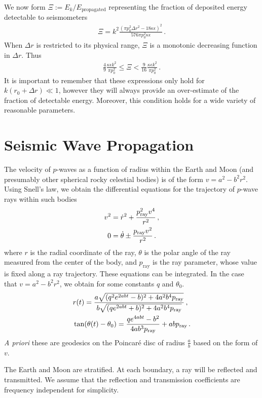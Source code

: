 \documentclass[prd,reprint,10pt,tightenlines]{revtex4-1}
\newcommand*\te[1]{\text{#1}}
\newcommand*\p[1]{\left(#1\right)}
\newcommand*\f[2]{\frac{#1}{#2}}
\begin{document}
We now form $\Xi:=E_k/E_\te{propagated}$ representing the fraction of deposited energy detectable to seismometers
\begin{align}
\Xi = k^2\f{\p{\pi p_0^2\Delta r^2-18\kappa \epsilon}^2}{576 \pi p_0^2 \kappa \epsilon}\,.
\end{align}
When $\Delta r$ is restricted to its physical range, $\Xi$ is a monotonic decreasing function in $\Delta r$. Thus
\begin{align}
\f{4}{9}\f{\kappa\epsilon k^2}{\pi  p_0^2} \leq \Xi <\f{9}{16}\f{\kappa\epsilon k^2}{\pi  p_0^2}\,.
\end{align}
It is important to remember that these expressions only hold for $k(r_0+\Delta r)\ll 1$, however they will always provide an over-estimate of the fraction of detectable energy. Moreover, this condition holds for a wide variety of reasonable parameters.

\section{Seismic Wave Propagation}
The velocity of $p$-waves as a function of radius within the Earth and Moon (and presumably other spherical rocky celestial bodies) is of the form $v = a^2 - b^2 r^2$. Using Snell's law, we obtain the differential equations for the trajectory of $p$-wave rays within such bodies
\begin{align}
v^2 \notag&= \dot r^2 + \f{p_\te{ray}^2 v^4}{r^2}\,,\\
0 &=\dot\theta\pm\f{p_\te{ray} v^2}{r^2}\,.
\end{align}
where $r$ is the radial coordinate of the ray, $\theta$ is the polar angle of the ray measured from the center of the body, and $p_\te{ray}$ is the ray parameter, whose value is fixed along a ray trajectory. These equations can be integrated. In the case that $v = a^2 - b^2 r^2$, we obtain for some constants $q$ and $\theta_0$.
\begin{align}
\notag&r(t) = \f{a\sqrt{(q^2e^{2abt}-b)^2 + 4a^2b^4 p_\te{ray}}}{b\sqrt{(qe^{2abt}+b)^2 + 4a^2b^4 p_\te{ray}}}\,,\\
&\tan(\theta(t) - \theta_0) = \f{qe^{4abt}-b^2}{4ab^3p_\te{ray}}+abp_\te{ray}\,.
\end{align}
\textit{A priori} these are geodesics on the Poincar\'e disc of radius $\f ab$ based on the form of $v$. 

The Earth and Moon are stratified. At each boundary, a ray will be reflected and transmitted. We assume that the reflection and transmission coefficients are frequency independent for simplicity. 
\end{document}
